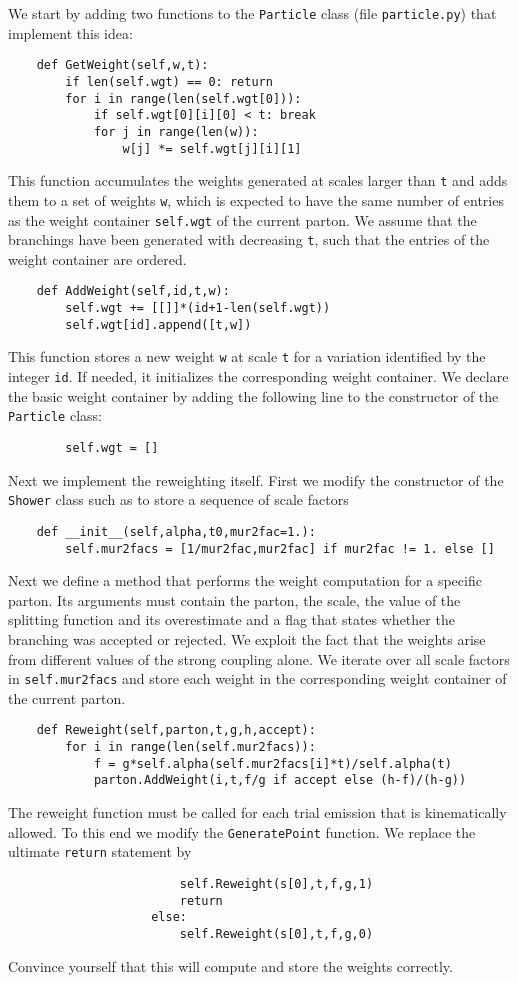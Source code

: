 \documentclass[10pt,fleqn]{scrartcl}
\begin{document}
We start by adding two functions to the {\tt Particle} class
(file {\tt particle.py}) that implement this idea:
\begin{verbatim}
    def GetWeight(self,w,t):
        if len(self.wgt) == 0: return
        for i in range(len(self.wgt[0])):
            if self.wgt[0][i][0] < t: break
            for j in range(len(w)):
                w[j] *= self.wgt[j][i][1]
\end{verbatim}
This function accumulates the weights generated at scales larger than {\tt t}
and adds them to a set of weights {\tt w}, which is expected to have the same
number of entries as the weight container {\tt self.wgt} of the current parton.
We assume that the branchings have been generated with decreasing {\tt t},
such that the entries of the weight container are ordered.
\begin{verbatim}
    def AddWeight(self,id,t,w):
        self.wgt += [[]]*(id+1-len(self.wgt))
        self.wgt[id].append([t,w])
\end{verbatim}
This function stores a new weight {\tt w} at scale {\tt t} for a variation
identified by the integer {\tt id}. If needed, it initializes the corresponding
weight container. We declare the basic weight container by adding the following
line to the constructor of the {\tt Particle} class:
\begin{verbatim}
        self.wgt = []
\end{verbatim}

Next we implement the reweighting itself. First we modify
the constructor of the {\tt Shower} class such as to store a sequence of
scale factors
\begin{verbatim}
    def __init__(self,alpha,t0,mur2fac=1.):
        self.mur2facs = [1/mur2fac,mur2fac] if mur2fac != 1. else []
\end{verbatim}
Next we define a method that performs the weight computation for a specific parton.
Its arguments must contain the parton, the scale, the value of the splitting function
and its overestimate and a flag that states whether the branching was accepted or
rejected. We exploit the fact that the weights arise from different values of
the strong coupling alone. We iterate over all scale factors in {\tt self.mur2facs}
and store each weight in the corresponding weight container of the current parton.
\begin{verbatim}
    def Reweight(self,parton,t,g,h,accept):
        for i in range(len(self.mur2facs)):
            f = g*self.alpha(self.mur2facs[i]*t)/self.alpha(t)
            parton.AddWeight(i,t,f/g if accept else (h-f)/(h-g))
\end{verbatim}
The reweight function must be called for each trial emission that is kinematically
allowed. To this end we modify the {\tt GeneratePoint} function. We replace the
ultimate {\tt return} statement by
\begin{verbatim}
                        self.Reweight(s[0],t,f,g,1)
                        return
                    else:
                        self.Reweight(s[0],t,f,g,0)
\end{verbatim}
Convince yourself that this will compute and store the weights correctly.
\end{document}
